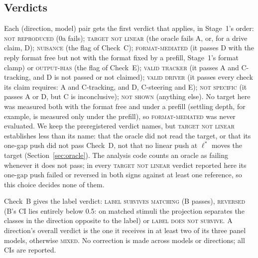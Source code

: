 \documentclass[11pt]{article}
\newcommand{\verdict}[1]{\textsc{\MakeLowercase{#1}}}
\begin{document}
\subsection{Verdicts}
Each (direction, model) pair gets the first verdict that applies, in Stage~1's order: \verdict{NOT REPRODUCED} (0a fails); \verdict{TARGET NOT LINEAR} (the oracle fails A, or, for a drive claim, D); \verdict{NUISANCE} (the flag of Check~C); \verdict{FORMAT-MEDIATED} (it passes D with the reply format free but not with the format fixed by a prefill, Stage~1's format clamp) or \verdict{OUTPUT-BIAS} (the flag of Check~E); \verdict{VALID TRACKER} (it passes A and C-tracking, and D is not passed or not claimed); \verdict{VALID DRIVER} (it passes every check its claim requires: A and C-tracking, and D, C-steering and E); \verdict{NOT SPECIFIC} (it passes A or D, but C is inconclusive); \verdict{NOT SHOWN} (anything else). No target here was measured both with the format free and under a prefill (settling depth, for example, is measured only under the prefill), so \verdict{FORMAT-MEDIATED} was never evaluated. We keep the preregistered verdict names, but \verdict{TARGET NOT LINEAR} establishes less than its name: that the oracle did not read the target, or that its one-gap push did not pass Check~D, not that no linear push at $\ell^*$ moves the target (Section~\ref{sec:oracle}). The analysis code counts an oracle as failing whenever it does not pass; in every \verdict{TARGET NOT LINEAR} verdict reported here its one-gap push failed or reversed in both signs against at least one reference, so this choice decides none of them.

Check~B gives the label verdict: \verdict{LABEL SURVIVES MATCHING} (B passes), \verdict{REVERSED} (B's CI lies entirely below 0.5: on matched stimuli the projection separates the classes in the direction opposite to the label) or \verdict{LABEL DOES NOT SURVIVE}. A direction's overall verdict is the one it receives in at least two of its three panel models, otherwise \verdict{MIXED}. No correction is made across models or directions; all CIs are reported.
\end{document}
